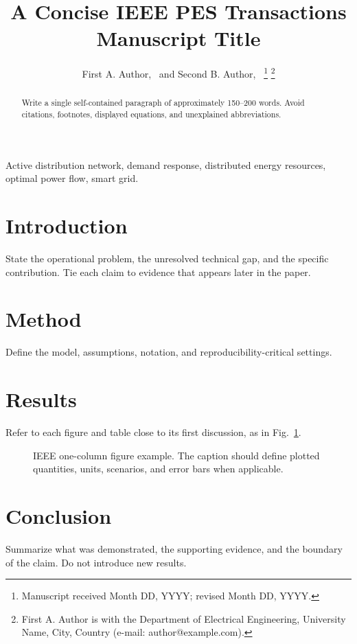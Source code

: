 \documentclass[journal]{IEEEtran}
\begin{document}
\title{A Concise IEEE PES Transactions Manuscript Title}

\author{First A. Author,~
        and Second B. Author,~%
\thanks{Manuscript received Month DD, YYYY; revised Month DD, YYYY.}
\thanks{First A. Author is with the Department of Electrical Engineering,
University Name, City, Country (e-mail: author@example.com).}}

\maketitle

\begin{abstract}
Write a single self-contained paragraph of approximately 150--200 words.
Avoid citations, footnotes, displayed equations, and unexplained abbreviations.
\end{abstract}

\begin{IEEEkeywords}
Active distribution network, demand response, distributed energy resources,
optimal power flow, smart grid.
\end{IEEEkeywords}

\section{Introduction}
State the operational problem, the unresolved technical gap, and the specific
contribution. Tie each claim to evidence that appears later in the paper.

\section{Method}
Define the model, assumptions, notation, and reproducibility-critical settings.

\section{Results}
Refer to each figure and table close to its first discussion, as in Fig.~\ref{fig:example}.

\begin{figure}[!t]
\centering
{}
\caption{IEEE one-column figure example. The caption should define plotted
quantities, units, scenarios, and error bars when applicable.}
\label{fig:example}
\end{figure}

\section{Conclusion}
Summarize what was demonstrated, the supporting evidence, and the boundary of
the claim. Do not introduce new results.



\end{document}
